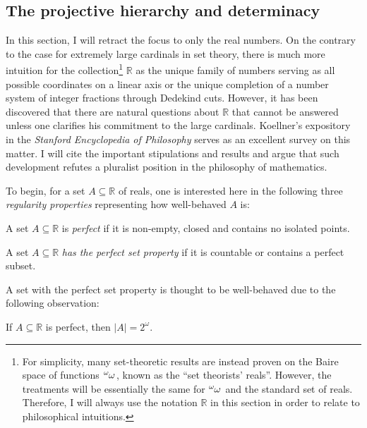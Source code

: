 \documentclass[12pt]{article}
\theoremstyle{plain}
\theoremstyle{definition}
\begin{document}
\subsection{The projective hierarchy and determinacy}
\label{subsec:determinacy}

In this section, I will retract the focus to only the real numbers. On the contrary to the case for extremely large cardinals in set theory, there is much more intuition for the collection\footnote{For simplicity, many set-theoretic results are instead proven on the Baire space of functions $\tensor[^\omega]{\omega}{}$, known as the ``set theorists' reals''. However, the treatments will be essentially the same for $\tensor[^\omega]{\omega}{}$ and the standard set of reals. Therefore, I will always use the notation $\mathbb{R}$ in this section in order to relate to philosophical intuitions.} $\mathbb{R}$ as the unique family of numbers serving as all possible coordinates on a linear axis or the unique completion of a number system of integer fractions through Dedekind cuts. However, it has been discovered that there are natural questions about $\mathbb{R}$ that cannot be answered unless one clarifies his commitment to the large cardinals. Koellner's expository \cite{koellner-determinacy} in the \emph{Stanford Encyclopedia of Philosophy} serves as an excellent survey on this matter. I will cite the important stipulations and results and argue that such development refutes a pluralist position in the philosophy of mathematics.

To begin, for a set $A \subseteq \mathbb{R}$ of reals, one is interested here in the following three \emph{regularity properties} representing how well-behaved $A$ is:

\begin{definition}
	A set $A \subseteq \mathbb{R}$ is \emph{perfect} if it is non-empty, closed and contains no isolated points.

	A set $A \subseteq \mathbb{R}$ \emph{has the perfect set property} if it is countable or contains a perfect subset.
\end{definition}

A set with the perfect set property is thought to be well-behaved due to the following observation:

\begin{proposition}
	If $A \subseteq \mathbb{R}$ is perfect, then $\left|A\right| = 2^\omega$.
\end{proposition}
\end{document}
